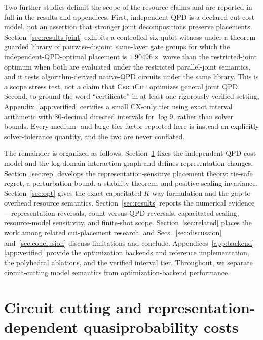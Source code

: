 \documentclass[
  aps,
  pra,
  reprint,
  amsmath,
  amssymb,
  longbibliography,
  nofootinbib,
  floatfix
]{revtex4-2}
\theoremstyle{plain}
\newcommand{\CertiCut}{\textsc{CertiCut}}
\begin{document}
Two further studies delimit the scope of the resource claims and are reported in full in the results and appendices. First, independent QPD is a declared cut-cost model, not an assertion that stronger joint decompositions preserve placements. Section~\ref{sec:results-joint} exhibits a controlled six-qubit witness under a theorem-guarded library of pairwise-disjoint same-layer gate groups for which the independent-QPD-optimal placement is $1.90496\times$ worse than the restricted-joint optimum when both are evaluated under the restricted parallel-joint semantics, and it tests algorithm-derived native-QPD circuits under the same library. This is a scope stress test, not a claim that \CertiCut{} optimizes general joint QPD. Second, to ground the word ``certificate'' in at least one rigorously verified setting, Appendix~\ref{app:verified} certifies a small CX-only tier using exact interval arithmetic with 80-decimal directed intervals for $\log 9$, rather than solver bounds. Every medium- and large-tier factor reported here is instead an explicitly solver-tolerance quantity, and the two are never conflated.

The remainder is organized as follows. Section~\ref{sec:model} fixes the independent-QPD cost model and the log-domain interaction graph and defines representation changes. Section~\ref{sec:rep} develops the representation-sensitive placement theory: tie-safe regret, a perturbation bound, a stability theorem, and positive-scaling invariance. Section~\ref{sec:opt} gives the exact capacitated $K$-way formulation and the gap-to-overhead resource semantics. Section~\ref{sec:results} reports the numerical evidence---representation reversals, count-versus-QPD reversals, capacitated scaling, resource-model sensitivity, and finite-shot scope. Section~\ref{sec:related} places the work among related cut-placement research, and Secs.~\ref{sec:discussion} and~\ref{sec:conclusion} discuss limitations and conclude. Appendices~\ref{app:backend}--\ref{app:verified} provide the optimization backends and reference implementation, the polyhedral ablations, and the verified interval tier. Throughout, we separate circuit-cutting model semantics from optimization-backend performance.

\section{Circuit cutting and representation-dependent quasiprobability costs}
\label{sec:model}
\end{document}
